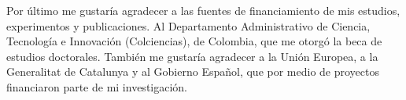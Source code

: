 Por último me gustaría agradecer a las fuentes de financiamiento de mis
estudios, experimentos y publicaciones. Al Departamento Administrativo de
Ciencia, Tecnología e Innovación (Colciencias), de Colombia, que me otorgó la
beca de estudios doctorales. También me gustaría agradecer a la Unión Europea, a
la Generalitat de Catalunya y al Gobierno Español, que por medio de proyectos
financiaron parte de mi investigación.



% 
% 
% 
% 


\endgroup



